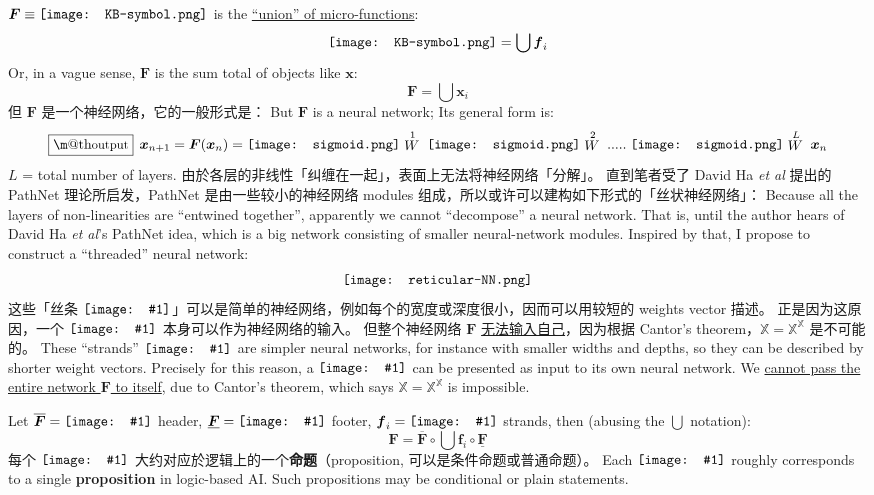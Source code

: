 \documentclass[orivec]{llncs}
\makeatletter
\newcommand{\vect}[1]{\boldsymbol{#1}}
\newcommand*\sigmoid{\vcenter{\hbox{\texttt{[image: sigmoid.png]}}}}
\newcommand*\KB{\vcenter{\hbox{\texttt{[image: KB-symbol.png]}}}}
\newcommand*\NewSym[1]{\vcenter{\hbox{\texttt{[image: \#1]}}}}
\renewcommand{\boxed}[1]{\fbox{\m@th$\displaystyle\scalebox{0.9}{#1}$} \,}
\makeatother
\begin{document}
$\vect{F} \equiv \KB$ is the \uline{``union'' of micro-functions}:
\begin{equation}
\KB = \bigcup \vect{f}_i
\end{equation}
Or, in a vague sense, $\vect{F}$ is the sum total of objects like $\vect{x}$:
\begin{equation}
\vect{F} = \bigcup \vect{x}_i
\end{equation}
\ifdefined\chinchin
但 $\vect{F}$ 是一个神经网络，它的一般形式是：
\else
But $\vect{F}$ is a neural network;  Its general form is:
\fi
\begin{equation}
\boxed{output} \; \vect{x}_{n+1} = \vect{F}(\vect{x}_n) = \sigmoid \stackrel{1}{W} \; \sigmoid \stackrel{2}{W} \; ..... \; \sigmoid \stackrel{L}{W} \; \vect{x}_n
\end{equation}
$L$ = total number of layers.  
\ifdefined\chinchin
由於各层的非线性「纠缠在一起」，表面上无法将神经网络「分解」。 直到笔者受了 David Ha \textit{et al} 提出的 PathNet \citep*{Fernando2017} 理论所启发，PathNet 是由一些较小的神经网络 modules 组成，所以或许可以建构如下形式的「丝状神经网络」：
\else
Because all the layers of non-linearities are ``entwined together'', apparently we cannot ``decompose'' a neural network.  That is, until the author hears of David Ha \textit{et al}'s PathNet \citep*{Fernando2017} idea, which is a big network consisting of smaller neural-network modules.  Inspired by that, I propose to construct a ``threaded'' neural network:
\fi
\begin{equation}
\vcenter{\hbox{\texttt{[image: reticular-NN.png]}}}
\end{equation}
\ifdefined\chinchin
这些「丝条 $\NewSym{strand.png}$」可以是简单的神经网络，例如每个的宽度或深度很小，因而可以用较短的 weights vector 描述。  正是因为这原因，一个 $\NewSym{strand.png}$ 本身可以作为神经网络的输入。 但整个神经网络 $\vect{F}$ \uline{无法输入自己}，因为根据 Cantor's theorem，$\mathbb{X} = \mathbb{X}^{\mathbb{X}}$ 是不可能的。
\else
These ``strands'' $\NewSym{strand.png}$ are simpler neural networks, for instance with smaller widths and depths, so they can be described by shorter weight vectors.  Precisely for this reason, a  $\NewSym{strand.png}$ can be presented as input to its own neural network.  We  \uline{cannot pass the entire network $\vect{F}$ to itself}, due to Cantor's theorem, which says $\mathbb{X} = \mathbb{X}^{\mathbb{X}}$ is impossible.
\fi

Let $\overline{\vect{F}} = \NewSym{header.png} $ header, $\underline{\vect{F}} = \NewSym{footer.png} $ footer, $\vect{f}_i = \NewSym{strand.png}$ strands, then (abusing the $\bigcup$ notation):
\begin{equation}
\vect{F} = \overline{\vect{F}} \circ \bigcup \vect{f}_i \circ \underline{\vect{F}}
\end{equation}
\ifdefined\chinchin
每个 $\NewSym{strand.png}$ 大约对应於逻辑上的一个\textbf{命题}（proposition, 可以是条件命题或普通命题）。
\else
Each $\NewSym{strand.png}$ roughly corresponds to a single \textbf{proposition} in logic-based AI. Such propositions may be conditional or plain statements.
\fi
\end{document}
